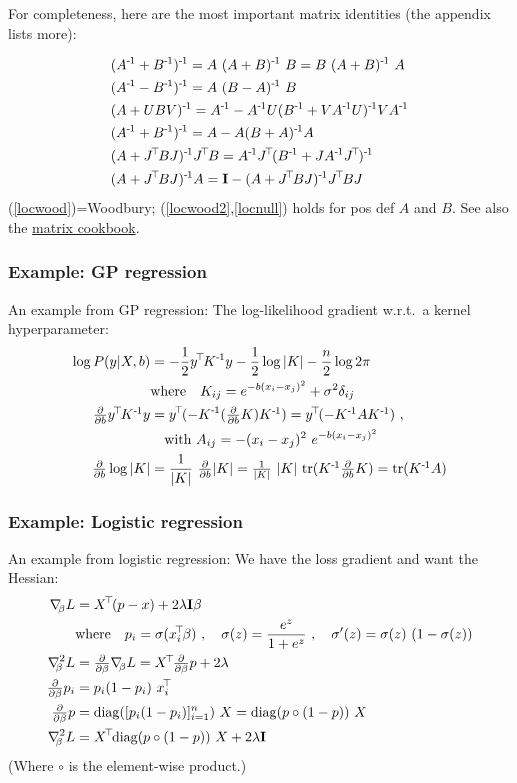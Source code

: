For completeness, here are the most important matrix identities (the appendix lists more):
\renewcommand{\bar}{\widehat}
\begin{Identities}
\begin{align}
&(A^\1 + B^\1)^\1 = A~ (A+B)^\1~ B = B~ (A+B)^\1~ A \\
&(A^\1 - B^\1)^\1 = A~ (B-A)^\1~ B \\
&(A+UBV)^\1 = A^\1 - A^\1 U (B^\1 + VA^\1U)^\1 V A^\1 \label{locwood}\\
&(A^\1+B^\1)^\1 = A - A (B + A)^\1 A \\
&(A + J^\T B J)^\1 J^\T B 
= A^\1 J^\T (B^\1 + J A^\1 J^\T)^\1 \label{locwood2}\\
&(A + J^\T B J)^\1 A
= \Id - (A + J^\T B J)^\1 J^\T B J  \label{locnull}
\end{align}
(\ref{locwood})=Woodbury; (\ref{locwood2},\ref{locnull}) holds for pos def $A$
and $B$. See also
the \href{http://www.imm.dtu.dk/pubdb/views/edoc_download.php/3274/pdf/imm3274.pdf}{matrix
cookbook}.
\end{Identities}


\subsubsection{Example: GP regression}

An example from GP regression: The log-likelihood gradient w.r.t.\ a
kernel hyperparameter:
\begin{align}
\log P(y | X, b)
&= -\half y^\T K^\1 y - \half \log|K| - \frac{n}{2} \log 2\pi \\
& \text{where}\quad K_{ij} = e^{-b(x_i-x_j)^2} + \s^2 \d_{ij} \\
\Del b y^\T K^\1 y
&= y^\T (-K^\1 (\Del b K) K^\1) = y^\T (-K^\1 A K^\1) ~, \feed
&\quad \text{with}~ A_{ij} = - (x_i-x_j)^2~ e^{-b(x_i-x_j)^2} \\
\Del b \log|K|
&= \frac{1}{|K|}~ \Del b |K|
 = \frac{1}{|K|}~ |K|~ \tr(K^\1 \Del b K)
 = \tr(K^\1 A)
\end{align}

\subsubsection{Example: Logistic regression}

An example from logistic regression: We have the loss gradient and
want the Hessian:
\begin{align}
\na_\b L
 &= X^\T (p-x) + 2 \l \Id \b \\
 & \text{where}\quad p_i = \s(x_i^\T \b) \comma \s(z) = \frac{e^z}{1+e^z} \comma \s'(z) =\s(z)~ (1-\s(z)) \\
\he[\b] L
 &= \Del \b \na_\b L = X^\T \Del \b p + 2\l \\
\Del \b p_i
 &= p_i (1-p_i)~ x_i^\T \\
\Del \b p
 &= \diag( [p_i (1-p_i)]_{i=1}^n )~ X = \diag(p\circ(1-p))~
 X\\
\he[\b] L
 &= X^\T \diag(p\circ (1-p) )~ X + 2\l\Id
\end{align}
(Where $\circ$ is the element-wise product.)


